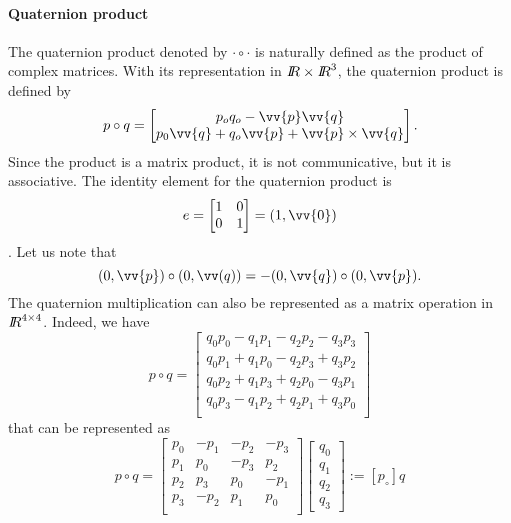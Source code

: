 \paragraph{Quaternion product} The quaternion product denoted by $\cdot \circ \cdot $ is naturally defined as the product of complex matrices. With its representation in $\mbox{\rm $I\!\!R$}\times \mbox{\rm $I\!\!R$}^3$, the quaternion product is defined by
\begin{equation}
  \label{eq:73}
  p \circ q =
  \begin{bmatrix}
    p_oq_o - \vv{p}\vv{q} \\
    p_0\vv{q}+q_o\vv{p} + \vv{p}\times\vv{q}
  \end{bmatrix}.
\end{equation}
Since the product is a matrix product, it is not communicative, but it is associative.  The identity element for the quaternion product is 
\begin{equation}
e=  \begin{bmatrix}
    1 & 0 \\
    0 & 1  \\
  \end{bmatrix} =(1,\vv{0})\label{eq:57}
\end{equation}
. Let us note that 
\begin{equation}
  \label{eq:74}
  (0,\vv{p})\circ (0,\vv(q)) = - (0,\vv{q})\circ (0,\vv{p}).
\end{equation}
The quaternion multiplication can also be represented as a matrix operation in $\mbox{\rm $I\!\!R$}^{4\times4}$. Indeed, we have
\begin{equation}
  \label{eq:75}
  p \circ q  =
  \begin{bmatrix}
    q_0 p_0 -q_1p_1-q_2p_2-q_3p_3\\
    q_0 p_1 +q_1p_0-q_2p_3+q_3p_2\\
    q_0 p_2 +q_1p_3+q_2p_0-q_3p_1\\
    q_0 p_3 -q_1p_2+q_2p_1+q_3p_0\\
  \end{bmatrix}
\end{equation}
that can be represented as
\begin{equation}
  \label{eq:76}
  p \circ q  =
  \begin{bmatrix}
    p_0 & -p_1 & -p_2 & -p_3 \\
    p_1 & p_0 & -p_3 & p_2 \\
    p_2 & p_3 & p_0 & -p_1 \\
    p_3 & -p_2 & p_1 & p_0 \\
  \end{bmatrix}
  \begin{bmatrix}
    q_0\\
    q_1\\
    q_2\\
    q_3
  \end{bmatrix} := [p_\circ]q
\end{equation}
